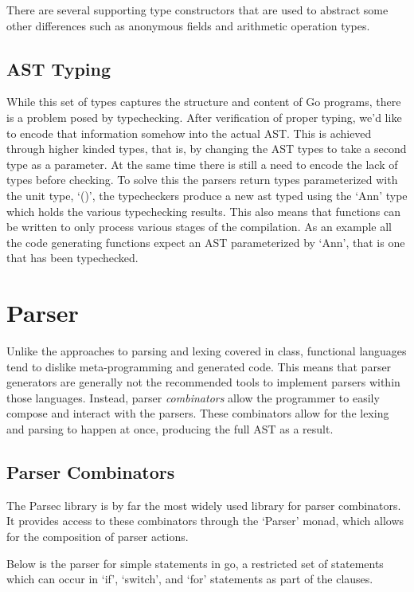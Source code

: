 \documentclass[11pt]{article}
\begin{document}
There are several supporting type constructors that are used to abstract some other differences such as anonymous fields and arithmetic operation types.

\subsection{AST Typing}

While this set of types captures the structure and content of Go programs, there is a problem posed by typechecking. After verification of proper typing, we'd like to encode that information somehow into the actual AST. This is achieved through higher kinded types, that is, by changing the AST types to take a second type as a parameter. At the same time there is still a need to encode the lack of types before checking. To solve this the parsers return types parameterized with the unit type, `()', the typecheckers produce a new ast typed using the `Ann' type which holds the various typechecking results. This also means that functions can be written to only process various stages of the compilation. As an example all the code generating functions expect an AST parameterized by `Ann', that is one that has been typechecked. 

\section{Parser}

Unlike the approaches to parsing and lexing covered in class, functional languages tend to dislike meta-programming and generated code. This means that parser generators are generally not the recommended tools to implement parsers within those languages. Instead, parser \textit{combinators} allow the programmer to easily compose and interact with the parsers. These combinators allow for the lexing and parsing to happen at once, producing the full AST as a result. 

\subsection{Parser Combinators}

The Parsec library is by far the most widely used library for parser combinators. It provides access to these combinators through the `Parser' monad, which allows for the composition of parser actions. 

Below is the parser for simple statements in go, a restricted set of statements which can occur in `if', `switch', and `for' statements as part of the clauses. 
\end{document}
